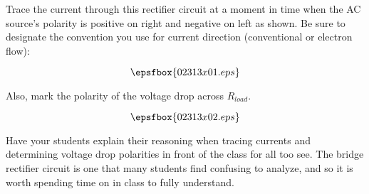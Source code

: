 

Trace the current through this rectifier circuit at a moment in time when the AC source's polarity is positive on right and negative on left as shown.  Be sure to designate the convention you use for current direction (conventional or electron flow):

$$\epsfbox{02313x01.eps}$$

Also, mark the polarity of the voltage drop across $R_{load}$.







$$\epsfbox{02313x02.eps}$$







Have your students explain their reasoning when tracing currents and determining voltage drop polarities in front of the class for all too see.  The bridge rectifier circuit is one that many students find confusing to analyze, and so it is worth spending time on in class to fully understand.





